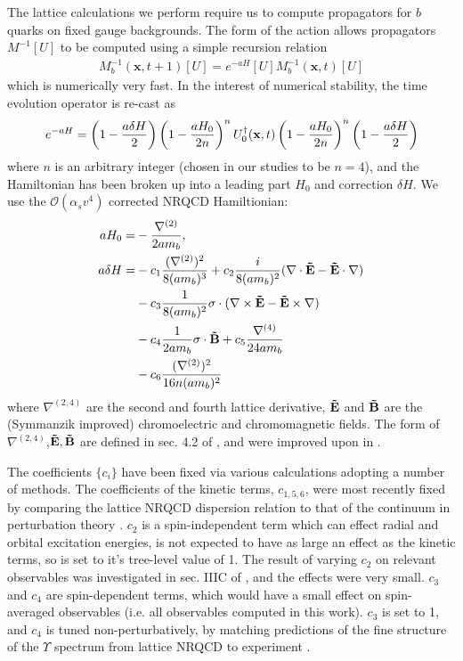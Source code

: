 The lattice calculations we perform require us to compute propagators for $b$ quarks on fixed gauge backgrounds. The form of the action allows propagators $M^{-1}[U]$ to be computed using a simple recursion relation
\begin{align}
  M_b^{-1}({\textbf{x}},t+1)[U] = e^{-aH}[U] M^{-1}_b({\textbf{x}},t)[U]
\end{align}
which is numerically very fast. In the interest of numerical stability, the time evolution operator is re-cast as
\begin{align}
  e^{-aH} = \left(1 - {a\delta H\over 2}\right)\left(1-{aH_0\over 2 n}\right)^n U_0^{\dagger}({\textbf{x}},t) \left(1 - {aH_0\over 2n}\right)^n \left(1-{a\delta H\over 2}\right)
\end{align}
where $n$ is an arbitrary integer (chosen in our studies to be $n=4$), and the Hamiltonian has been broken up into a leading part $H_0$ and correction $\delta H$. We use the $\mathcal{O}(\alpha_s v^4)$ corrected NRQCD Hamiltionian:
\begin{align}
  aH_0 =& - {\nabla^{(2)}\over 2am_b} , \\
  \nonumber
  a\delta H =& - c_1 {(\nabla^{(2)})^2 \over 8 (am_b)^3} + c_2{ i\over 8(am_b)^2} ( \nabla\cdot {\bf{\tilde{E}}} - {\bf{\tilde{E}}}\cdot \nabla) \\
  \nonumber
  & - c_3 {1\over 8(am_b)^2} \sigma\cdot ( \nabla\times{\bf{\tilde{E}}} - {\bf{\tilde{E}}}\times\nabla) \\
  \nonumber
  & - c_4 {1\over 2am_b} \sigma\cdot {\bf{\tilde{B}}} + c_5 {\nabla^{(4)}\over 24 am_b} \\
  & - c_6 {(\nabla^{(2)})^2\over 16n (am_b)^2}
\end{align}
where $\nabla^{(2,4)}$ are the second and fourth lattice derivative, ${\bf{\tilde{E}}}$ and ${\bf{\tilde{B}}}$ are the (Symmanzik improved) chromoelectric and chromomagnetic fields. The form of $\nabla^{(2,4)}$,${\bf{\tilde{E}}},{\bf{\tilde{B}}}$ are defined in sec. 4.2 of \cite{Lepage:1992tx}, and were improved upon in \cite{Gray:2005ur}.

The coefficients $\{c_i\}$ have been fixed via various calculations adopting a number of methods. The coefficients of the kinetic terms, $c_{1,5,6}$, were most recently fixed by comparing the lattice NRQCD dispersion relation to that of the continuum in perturbation theory \cite{Davies:2018fwg}. $c_2$ is a spin-independent term which can effect radial and orbital excitation energies, is not expected to have as large an effect as the kinetic terms, so is set to it's tree-level value of 1. The result of varying $c_2$ on relevant observables was investigated in sec. IIIC of \cite{Dowdall:2011wh}, and the effects were very small. $c_3$ and $c_4$ are spin-dependent terms, which would have a small effect on spin-averaged observables (i.e. all observables computed in this work). $c_3$ is set to 1, and $c_4$ is tuned non-perturbatively, by matching predictions of the fine structure of the $\Upsilon$ spectrum from lattice NRQCD to experiment \cite{Dowdall:2011wh}.

